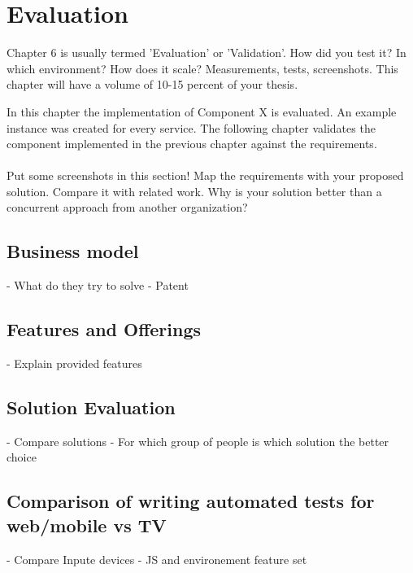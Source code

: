 \chapter{Evaluation\label{cha:chapter6}}

Chapter 6 is usually termed 'Evaluation' or 'Validation'. How did you test it? In which environment? How
does it scale? Measurements, tests, screenshots. This chapter will have a volume of 10-15 percent of your
thesis.

In this chapter the implementation of Component X is evaluated. An example instance was
created for every service. The following chapter validates the component implemented in
the previous chapter against the requirements.\\
\\
Put some screenshots in this section! Map the requirements with your proposed solution.
Compare it with related work. Why is your solution better than a concurrent approach from
another organization?

\section{Business model\label{sec:businessmodel}}

- What do they try to solve
- Patent

\section{Features and Offerings\label{sec:features}}

- Explain provided features

\section{Solution Evaluation\label{sec:usab}}

- Compare solutions
- For which group of people is which solution the better choice

\section{Comparison of writing automated tests for web/mobile vs TV\label{sec:diffInWritingTests}}

- Compare Inpute devices
- JS and environement feature set
